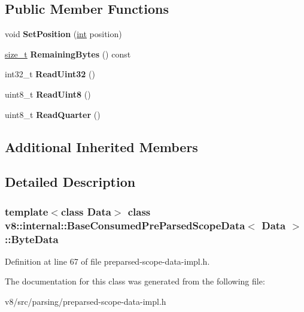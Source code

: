 \subsection*{Public Member Functions}
\begin{DoxyCompactItemize}
\item 
\mbox{\label{classv8_1_1internal_1_1BaseConsumedPreParsedScopeData_1_1ByteData_a12a647679ea70a65b8ac3c498e1207aa}} 
void {\bfseries Set\+Position} (\mbox{\hyperlink{classint}{int}} position)
\item 
\mbox{\label{classv8_1_1internal_1_1BaseConsumedPreParsedScopeData_1_1ByteData_aa1c52cb05bb3d3c67ec02cd718ef5ec2}} 
\mbox{\hyperlink{classsize__t}{size\+\_\+t}} {\bfseries Remaining\+Bytes} () const
\item 
\mbox{\label{classv8_1_1internal_1_1BaseConsumedPreParsedScopeData_1_1ByteData_a756a634259f59023383c7050e029a17c}} 
int32\+\_\+t {\bfseries Read\+Uint32} ()
\item 
\mbox{\label{classv8_1_1internal_1_1BaseConsumedPreParsedScopeData_1_1ByteData_ab60bb01d66eb29232e3490c7a4e1a845}} 
uint8\+\_\+t {\bfseries Read\+Uint8} ()
\item 
\mbox{\label{classv8_1_1internal_1_1BaseConsumedPreParsedScopeData_1_1ByteData_a1c3f6daddd0ac77da78a9e02f1129c49}} 
uint8\+\_\+t {\bfseries Read\+Quarter} ()
\end{DoxyCompactItemize}
\subsection*{Additional Inherited Members}


\subsection{Detailed Description}
\subsubsection*{template$<$class Data$>$\newline
class v8\+::internal\+::\+Base\+Consumed\+Pre\+Parsed\+Scope\+Data$<$ Data $>$\+::\+Byte\+Data}



Definition at line 67 of file preparsed-\/scope-\/data-\/impl.\+h.



The documentation for this class was generated from the following file\+:\begin{DoxyCompactItemize}
\item 
v8/src/parsing/preparsed-\/scope-\/data-\/impl.\+h\end{DoxyCompactItemize}
